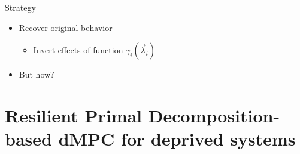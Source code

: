 \documentclass[aspectratio=169]{beamer}
\begin{document}
\begin{frame}{Strategy}
  \begin{itemize}
    \item Recover original behavior
          \begin{itemize}
            \item Invert effects of function $\gamma_{i}(\vec{\lambda}_{i})$ 
          \end{itemize}
    \item<3-> But how? 
  \end{itemize}
\end{frame}

\section{Resilient Primal Decomposition-based dMPC for deprived systems}
\end{document}
